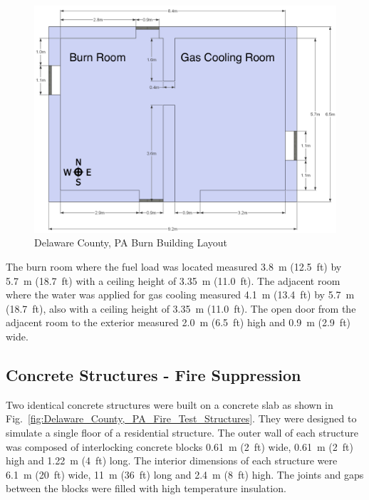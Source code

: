 \documentclass[12pt,oneside]{book}
\begin{document}

\begin{figure}[!ht]
	\includegraphics[width=6in]{../Figures/Pictures/DelCoBurnBuildingDimensions}
	\caption{Delaware County, PA Burn Building Layout}
	\label{fig:Delaware_County,_PA_Burn_Building_Layout}
\end{figure}

The burn room where the fuel load was located measured 3.8~m (12.5~ft) by 5.7~m (18.7~ft) with a ceiling height of 3.35~m (11.0~ft). The adjacent room where the water was applied for gas cooling measured 4.1~m (13.4~ft) by 5.7~m (18.7~ft), also with a ceiling height of 3.35~m (11.0~ft). The open door from the adjacent room to the exterior measured 2.0~m (6.5~ft) high and 0.9~m (2.9~ft) wide. 

\subsection{Concrete Structures - Fire Suppression}
\label{sec:Experimental Structures}

Two identical concrete structures were built on a concrete slab as shown in Fig.~\ref{fig:Delaware_County,_PA_Fire_Test_Structures}. They were designed to simulate a single floor of a residential structure.  The outer wall of each structure was composed of interlocking concrete blocks 0.61~m (2~ft) wide, 0.61~m (2~ft) high and 1.22~m (4~ft) long.  The interior dimensions of each structure were 6.1~m (20~ft) wide, 11~m (36~ft) long and 2.4~m (8~ft) high.  The joints and gaps between the blocks were filled with high temperature insulation.
\end{document}
